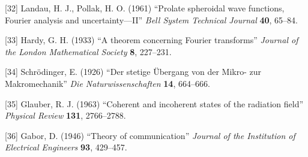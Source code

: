 \documentclass[
]{ltjsarticle}
\begin{document}
{[}32{]} Landau, H. J., Pollak, H. O. (1961) ``Prolate spheroidal wave
functions, Fourier analysis and uncertainty---II'' \emph{Bell System
Technical Journal} \textbf{40}, 65--84.

{[}33{]} Hardy, G. H. (1933) ``A theorem concerning Fourier transforms''
\emph{Journal of the London Mathematical Society} \textbf{8}, 227--231.

{[}34{]} Schrödinger, E. (1926) ``Der stetige Übergang von der Mikro-
zur Makromechanik'' \emph{Die Naturwissenschaften} \textbf{14},
664--666.

{[}35{]} Glauber, R. J. (1963) ``Coherent and incoherent states of the
radiation field'' \emph{Physical Review} \textbf{131}, 2766--2788.

{[}36{]} Gabor, D. (1946) ``Theory of communication'' \emph{Journal of
the Institution of Electrical Engineers} \textbf{93}, 429--457.
\end{document}
